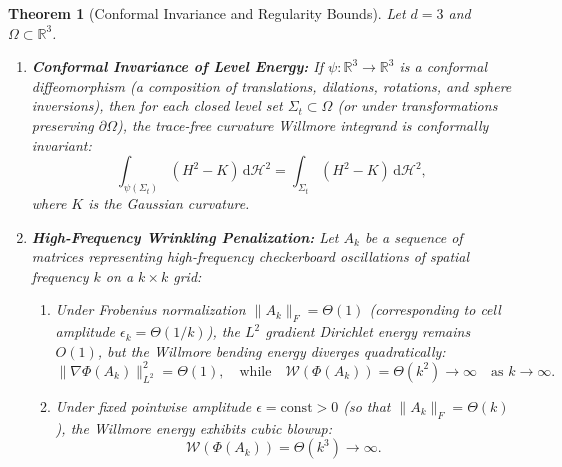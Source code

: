 \documentclass[11pt,a4paper,reqno]{amsart}
\newtheorem{theorem}{Theorem}[section]
\theoremstyle{definition}
\numberwithin{equation}{section}
\newcommand{\R}{\mathbb{R}}
\newcommand{\dif}{\,\mathrm{d}}
\begin{document}
\begin{theorem}[Conformal Invariance and Regularity Bounds]
\label{thm:willmore_invariance}
Let $d = 3$ and $\Omega \subset \R^3$. 
\begin{enumerate}[label=(\alph*)]
    \item \textbf{Conformal Invariance of Level Energy:} If $\psi \colon \R^3 \to \R^3$ is a conformal diffeomorphism (a composition of translations, dilations, rotations, and sphere inversions), then for each closed level set $\Sigma_t \subset \Omega$ (or under transformations preserving $\partial\Omega$), the trace-free curvature Willmore integrand is conformally invariant:
    \begin{equation}
        \int_{\psi(\Sigma_t)} (H^2 - K) \dif \mathcal{H}^2 = \int_{\Sigma_t} (H^2 - K) \dif \mathcal{H}^2,
    \end{equation}
    where $K$ is the Gaussian curvature.
    \item \textbf{High-Frequency Wrinkling Penalization:} Let $A_k$ be a sequence of matrices representing high-frequency checkerboard oscillations of spatial frequency $k$ on a $k \times k$ grid:
    \begin{enumerate}[label=(\roman*)]
        \item Under Frobenius normalization $\|A_k\|_F = \Theta(1)$ (corresponding to cell amplitude $\epsilon_k = \Theta(1/k)$), the $L^2$ gradient Dirichlet energy remains $O(1)$, but the Willmore bending energy diverges quadratically:
        \begin{equation}
            \|\nabla \Phi(A_k)\|_{L^2}^2 = \Theta(1), \quad \text{while} \quad \mathcal{W}(\Phi(A_k)) = \Theta(k^2) \longrightarrow \infty \quad \text{as } k \to \infty.
        \end{equation}
        \item Under fixed pointwise amplitude $\epsilon = \mathrm{const} > 0$ (so that $\|A_k\|_F = \Theta(k)$), the Willmore energy exhibits cubic blowup:
        \begin{equation}
            \mathcal{W}(\Phi(A_k)) = \Theta(k^3) \longrightarrow \infty.
        \end{equation}
    \end{enumerate}
\end{enumerate}
\end{theorem}
\end{document}
